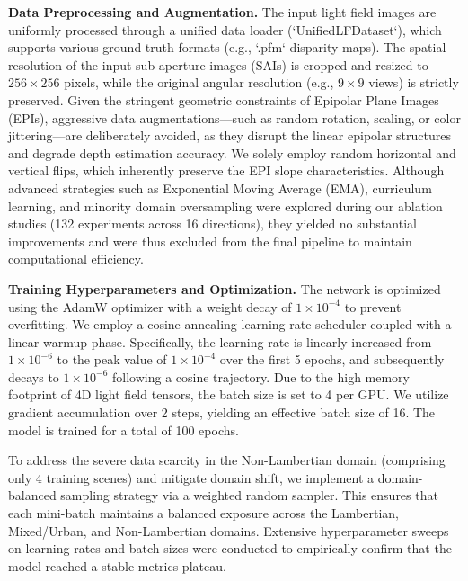 \documentclass[lettersize,journal]{IEEEtran}
\begin{document}
\textbf{Data Preprocessing and Augmentation.} 
The input light field images are uniformly processed through a unified data loader (`UnifiedLFDataset`), which supports various ground-truth formats (e.g., `.pfm` disparity maps). The spatial resolution of the input sub-aperture images (SAIs) is cropped and resized to $256 \times 256$ pixels, while the original angular resolution (e.g., $9 \times 9$ views) is strictly preserved. Given the stringent geometric constraints of Epipolar Plane Images (EPIs), aggressive data augmentations—such as random rotation, scaling, or color jittering—are deliberately avoided, as they disrupt the linear epipolar structures and degrade depth estimation accuracy. We solely employ random horizontal and vertical flips, which inherently preserve the EPI slope characteristics. Although advanced strategies such as Exponential Moving Average (EMA), curriculum learning, and minority domain oversampling were explored during our ablation studies (132 experiments across 16 directions), they yielded no substantial improvements and were thus excluded from the final pipeline to maintain computational efficiency.

\textbf{Training Hyperparameters and Optimization.} 
The network is optimized using the AdamW optimizer with a weight decay of $1 \times 10^{-4}$ to prevent overfitting. We employ a cosine annealing learning rate scheduler coupled with a linear warmup phase. Specifically, the learning rate is linearly increased from $1 \times 10^{-6}$ to the peak value of $1 \times 10^{-4}$ over the first 5 epochs, and subsequently decays to $1 \times 10^{-6}$ following a cosine trajectory. Due to the high memory footprint of 4D light field tensors, the batch size is set to 4 per GPU. We utilize gradient accumulation over 2 steps, yielding an effective batch size of 16. The model is trained for a total of 100 epochs. 

To address the severe data scarcity in the Non-Lambertian domain (comprising only 4 training scenes) and mitigate domain shift, we implement a domain-balanced sampling strategy via a weighted random sampler. This ensures that each mini-batch maintains a balanced exposure across the Lambertian, Mixed/Urban, and Non-Lambertian domains. Extensive hyperparameter sweeps on learning rates and batch sizes were conducted to empirically confirm that the model reached a stable metrics plateau.
\end{document}

